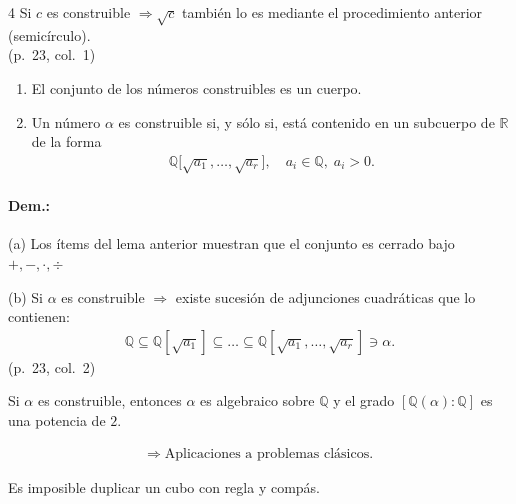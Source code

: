 \documentclass[landscape,a4paper]{article}
\begin{document}
\begin{multicols}{4}
Si $c$ es construible $\Rightarrow \sqrt{c}$ también lo es mediante el procedimiento anterior (semicírculo).\\ (p.~23, col.~1)
\begin{tcolorbox}[colback=white,colframe=red!80!black,colbacktitle=red!80!black,coltitle=white,title={Teorema (p.~23, col.~2)}]
\begin{enumerate}
  \item[(a)] El conjunto de los números construibles es un cuerpo.
  \item[(b)] Un número $\alpha$ es construible si, y sólo si, está contenido en un subcuerpo de $\mathbb{R}$ de la forma
  \begin{align*}
     \mathbb{Q}\bigl[\sqrt{a_1},\dots,\sqrt{a_r}\bigr], \quad a_i\in\mathbb{Q},\;a_i>0.
  \end{align*}
\end{enumerate}
\end{tcolorbox}
\paragraph{Dem.:} (a) Los ítems del lema anterior muestran que el conjunto es cerrado bajo $+,-,\cdot,\div$
\par (b) Si $\alpha$ es construible $\Rightarrow$ existe sucesión de adjunciones cuadráticas que lo contienen:
\begin{align*}
  \mathbb{Q}\subseteq \mathbb{Q}[\sqrt{a_1}] \subseteq \dots \subseteq \mathbb{Q}[\sqrt{a_1},\dots,\sqrt{a_r}]\ni \alpha.
\end{align*}
(p.~23, col.~2)
\begin{tcolorbox}[colback=white,colframe=blue!80!black,colbacktitle=blue!80!black,coltitle=white,title={Números Construibles (p.~23, col.~3)}]
Si $\alpha$ es construible, entonces $\alpha$ es algebraico sobre $\mathbb{Q}$ y el grado $[\mathbb{Q}(\alpha):\mathbb{Q}]$ es una potencia de $2$.
\end{tcolorbox}
\begin{align*}
  \Longrightarrow\;\text{Aplicaciones a problemas clásicos.}
\end{align*}
\begin{tcolorbox}[colback=white,colframe=red!80!black,colbacktitle=red!80!black,coltitle=white,title={Proposición (Duplicar el cubo) (p.~23, col.~4)}]
Es imposible duplicar un cubo con regla y compás.
\end{tcolorbox}

\end{multicols}
\end{document}
